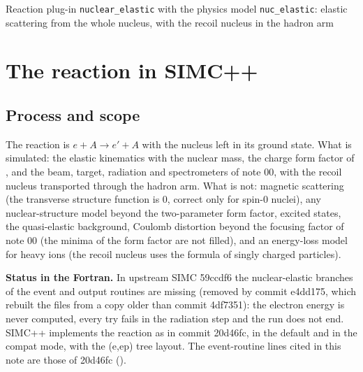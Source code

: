 \documentclass{simcnote}
\begin{document}
%
  {Reaction plug-in \texttt{nuclear\_elastic} with the physics model \texttt{nuc\_elastic}: elastic scattering from the
   whole nucleus, with the recoil nucleus in the hadron arm}
\simcnotemaketitle
{}
\simcnotetoc

\section{The reaction in SIMC++}

\subsection{Process and scope}
The reaction is $e + A \to e' + A$ with the nucleus left in its ground state. What is simulated: the elastic
kinematics with the nuclear mass, the charge form factor of , and the beam, target, radiation and
spectrometers of note 00, with the recoil nucleus transported through the hadron arm. What is not: magnetic scattering
(the transverse structure function is 0, correct only for spin-0 nuclei), any nuclear-structure model beyond the
two-parameter form factor, excited states, the quasi-elastic background, Coulomb distortion beyond the focusing factor of
note 00 (the minima of the form factor are not filled), and an energy-loss model for heavy ions (the recoil nucleus uses
the formula of singly charged particles).

\begin{simcwarning}
\textbf{Status in the Fortran.} In upstream SIMC 59ccdf6 the nuclear-elastic branches of the event and output routines
are missing (removed by commit e4dd175, which rebuilt the files from a copy older than commit 4df7351): the electron
energy is never computed, every try fails in the radiation step and the run does not end. SIMC++ implements the
reaction as in commit 20d46fc, in the default and in the compat mode, with the (e,e\pr p) tree layout. The event-routine
lines cited in this note are those of 20d46fc ().
\end{simcwarning}
\end{document}
